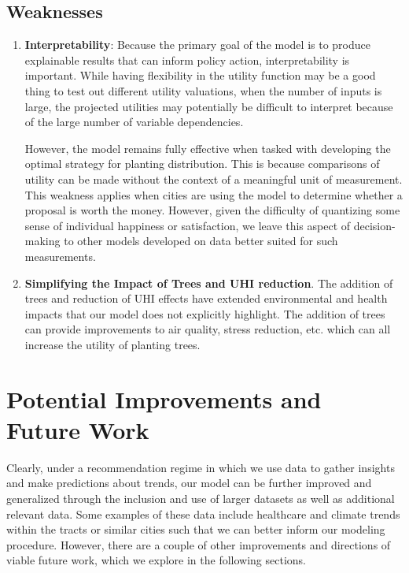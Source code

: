 \documentclass[11pt]{article}
\begin{document}
\subsection{Weaknesses}
\begin{enumerate}
\item \textbf{Interpretability}: Because the primary goal of the model is to produce explainable results that can inform policy action, interpretability is important. While having flexibility in the utility function may be a good thing to test out different utility valuations, when the number of inputs is large, the projected utilities may potentially be difficult to interpret because of the large number of variable dependencies.

However, the model remains fully effective when tasked with developing the optimal strategy for planting distribution. This is because comparisons of utility can be made without the context of a meaningful unit of measurement. This weakness applies when cities are using the model to determine whether a proposal is worth the money. However, given the difficulty of quantizing some sense of individual happiness or satisfaction, we leave this aspect of decision-making to other models developed on data better suited for such measurements.

\item \textbf{Simplifying the Impact of Trees and UHI reduction}. The addition of trees and reduction of UHI effects have extended environmental and health impacts that our model does not explicitly highlight. The addition of trees can provide improvements to air quality, stress reduction, etc. which can all increase the utility of planting trees.
\end{enumerate}

\section{Potential Improvements and Future Work}
Clearly, under a recommendation regime in which we use data to gather insights and make predictions about trends, our model can be further improved and generalized through the inclusion and use of larger datasets as well as additional relevant data. Some examples of these data include healthcare and climate trends within the tracts or similar cities such that we can better inform our modeling procedure. However, there are a couple of other improvements and directions of viable future work, which we explore in the following sections.
\end{document}
